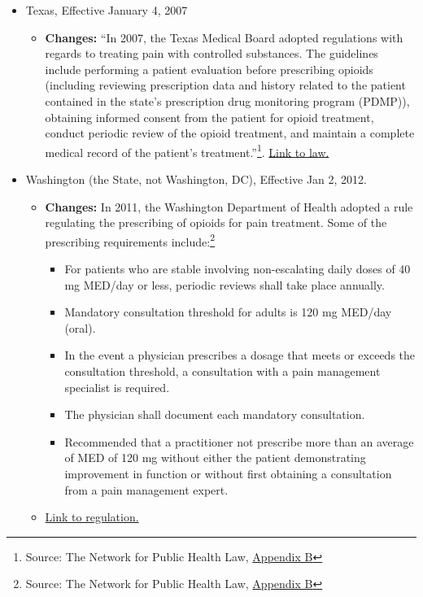 \documentclass[12pt]{article}
\begin{document}
\begin{itemize}
  \item Texas, Effective January 4, 2007
  \begin{itemize}
    \item \textbf{Changes:} ``In 2007, the Texas Medical Board adopted regulations with regards to treating pain with
controlled substances. The guidelines include performing a patient evaluation before prescribing opioids (including reviewing
prescription data and history related to the patient contained in the state’s prescription drug monitoring program (PDMP)), obtaining informed consent from the patient for opioid treatment, conduct periodic review of the opioid treatment, and maintain a complete medical record of the patient’s treatment.''\footnote{Source: The Network for Public Health Law, \href{https://azdhs.gov/documents/prevention/womens-childrens-health/injury-prevention/opioid-prevention/appendix-b-state-by-state-summary.pdf}{Appendix B}}. \href{https://texreg.sos.state.tx.us/public/readtac$ext.TacPage?sl=R&app=9&p_dir=&p_rloc=&p_tloc=&p_ploc=&pg=1&p_tac=&ti=22&pt=9&ch=170&rl=3}{Link to law.}
  \end{itemize}
  \item Washington (the State, not Washington, DC), Effective Jan 2, 2012.
  \begin{itemize}
    \item \textbf{Changes:} In 2011, the Washington Department of Health adopted a rule regulating the prescribing of opioids for pain treatment. Some of the prescribing requirements include:\footnote{Source: The Network for Public Health Law, \href{https://azdhs.gov/documents/prevention/womens-childrens-health/injury-prevention/opioid-prevention/appendix-b-state-by-state-summary.pdf}{Appendix B}}
    \begin{itemize}
      \item For patients who are stable involving non-escalating daily doses of 40 mg MED/day or less, periodic reviews shall take place annually.
      \item Mandatory consultation threshold for adults is 120 mg MED/day (oral).
      \item In the event a physician prescribes a dosage that meets or exceeds the consultation
      threshold, a consultation with a pain management specialist is required.
      \item The physician shall document each mandatory consultation.
      \item Recommended that a practitioner not prescribe more than an average of MED of
      120 mg without either the patient demonstrating improvement in function or without first obtaining a consultation from a pain management expert.
    \end{itemize}
    \item \href{http://apps.leg.wa.gov/documents/laws/wsr/2011/12/11-12-025.htm}{Link to regulation.}
    \end{itemize}
\end{itemize}
\end{document}
